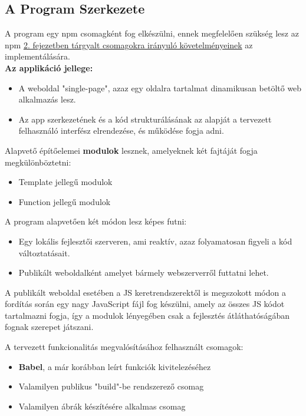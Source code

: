 \subsection{A Program Szerkezete}

A program egy npm csomagként fog elkészülni, ennek megfelelően szükség lesz az npm \hyperlink{section2.2}{2. fejezetben tárgyalt csomagokra irányuló követelményeinek} az implementálására.\\

\textbf{Az applikáció jellege:}

\begin{itemize}
	\item A weboldal "single-page", azaz egy oldalra tartalmat dinamikusan betöltő web alkalmazás lesz.
	\item Az app szerkezetének és a kód strukturálásának az alapját a tervezett felhasználó interfész elrendezése, és működése fogja adni.
\end{itemize}

\noindent Alapvető építőelemei \textbf{modulok} lesznek, amelyeknek két fajtáját fogja megkülönböztetni:

\begin{itemize}
	\item Template jellegű modulok
	\item Function jellegű modulok
\end{itemize}

\noindent A program alapvetően két módon lesz képes futni:

\begin{itemize}
	\item Egy lokális fejlesztői szerveren, ami reaktív, azaz folyamatosan figyeli a kód változtatásait.
	\item Publikált weboldalként amelyet bármely webszerverről futtatni lehet.
\end{itemize}

\noindent A publikált weboldal esetében a JS keretrendszerektől is megszokott módon a fordítás során egy nagy JavaScript fájl fog készülni, amely az összes JS kódot tartalmazni fogja, így a modulok lényegében csak a fejlesztés átláthatóságában fognak szerepet játszani.

\noindent A tervezett funkcionalitás megvalósításához felhasznált csomagok:
\begin{itemize}
	\item \textbf{Babel}, a már korábban leírt funkciók kivitelezéséhez
	\item Valamilyen publikus "build"-be rendszerező csomag
	\item Valamilyen ábrák készítésére alkalmas csomag
\end{itemize}

